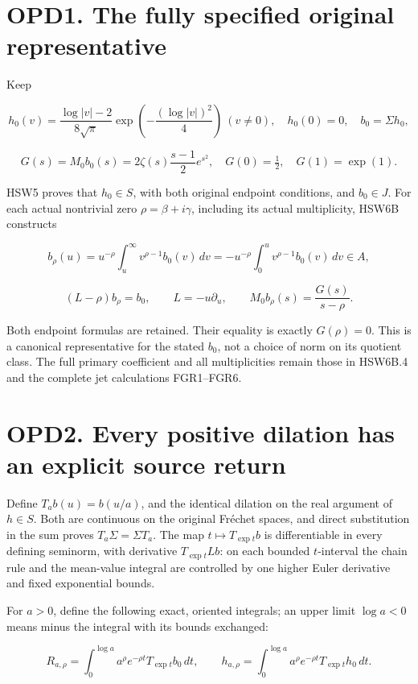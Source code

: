 \section{OPD1. The fully specified original
representative}\label{opd1.-the-fully-specified-original-representative}

Keep

\[
h_0(v)=\frac{\log|v|-2}{8\sqrt\pi}
\exp\!\left(-\frac{(\log|v|)^2}{4}\right)\ (v\ne0),
\quad h_0(0)=0,\quad b_0=\Sigma h_0,
\]

\[
G(s)=M_0b_0(s)=2\zeta(s)\frac{s-1}{2}e^{s^2},
\quad G(0)=\tfrac12,\quad G(1)=\exp(1).
\tag{OPD1.1}
\]

HSW5 proves that \(h_0\in S\), with both original endpoint conditions,
and \(b_0\in J\). For each actual nontrivial zero
\(\rho=\beta+i\gamma\), including its actual multiplicity, HSW6B
constructs

\[
b_\rho(u)=u^{-\rho}\int_u^\infty v^{\rho-1}b_0(v)\,dv
=-u^{-\rho}\int_0^u v^{\rho-1}b_0(v)\,dv\in A,
\]

\[
(L-\rho)b_\rho=b_0,\qquad
L=-u\partial_u,\qquad M_0b_\rho(s)=\frac{G(s)}{s-\rho}.
\tag{OPD1.2}
\]

Both endpoint formulas are retained. Their equality is exactly
\(G(\rho)=0\). This is a canonical representative for the stated
\(b_0\), not a choice of norm on its quotient class. The full primary
coefficient and all multiplicities remain those in HSW6B.4 and the
complete jet calculations FGR1--FGR6.

\section{OPD2. Every positive dilation has an explicit source
return}\label{opd2.-every-positive-dilation-has-an-explicit-source-return}

Define \(T_ab(u)=b(u/a)\), and the identical dilation on the real
argument of \(h\in S\). Both are continuous on the original Fréchet
spaces, and direct substitution in the sum proves
\(T_a\Sigma=\Sigma T_a\). The map \(t\mapsto T_{\exp t}b\) is
differentiable in every defining seminorm, with derivative
\(T_{\exp t}Lb\): on each bounded \(t\)-interval the chain rule and the
mean-value integral are controlled by one higher Euler derivative and
fixed exponential bounds.

For \(a>0\), define the following exact, oriented integrals; an upper
limit \(\log a<0\) means minus the integral with its bounds exchanged:

\[
R_{a,\rho}=\int_0^{\log a} a^\rho e^{-\rho t}T_{\exp t}b_0\,dt,
\qquad
h_{a,\rho}=\int_0^{\log a} a^\rho e^{-\rho t}T_{\exp t}h_0\,dt.
\tag{OPD2.1}
\]

